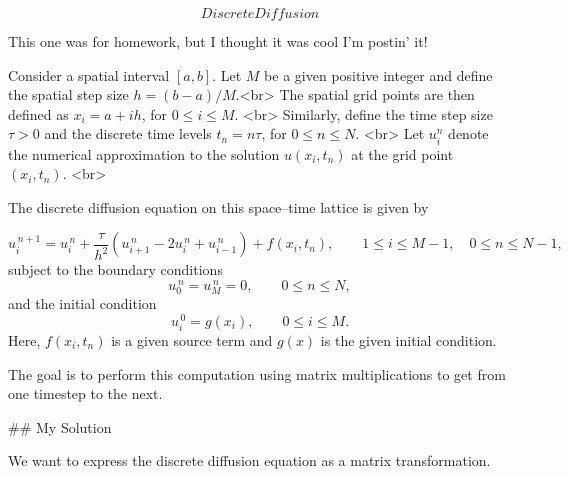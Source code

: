 $$
%
Discrete Diffusion
%
$$

This one was for homework, but I thought it was cool I'm postin' it!

Consider a spatial interval $[a, b]$. Let $M$ be a given positive integer and define the spatial step size $h = (b - a)/M$.<br>
The spatial grid points are then defined as $x_i = a + i h$, for $0 \le i \le M$. <br>
Similarly, define the time step size $\tau > 0$ and the discrete time levels $t_n = n\tau$, for $0 \le n \le N$. <br>
Let $u_i^n$ denote the numerical approximation to the solution $u(x_i, t_n)$ at the grid point $(x_i, t_n)$.  <br>

The discrete diffusion equation on this space–time lattice is given by

$$u_i^{\,n+1} = u_i^{\,n} + \frac{\tau}{h^2} \left( u_{i+1}^{\,n} - 2u_i^{\,n} + u_{i-1}^{\,n} \right) + f(x_i, t_n), 
\qquad 1 \le i \le M - 1,\quad 0 \le n \le N - 1,$$
subject to the boundary conditions
$$u_0^{\,n} = u_M^{\,n} = 0, \qquad 0 \le n \le N,$$
and the initial condition
$$u_i^{\,0} = g(x_i), \qquad 0 \le i \le M.$$
Here, $f(x_i, t_n)$ is a given source term and $g(x)$ is the given initial condition.

The goal is to perform this computation using matrix multiplications to get from one timestep to the next.

## My Solution

We want to express the discrete diffusion equation as a matrix transformation.

